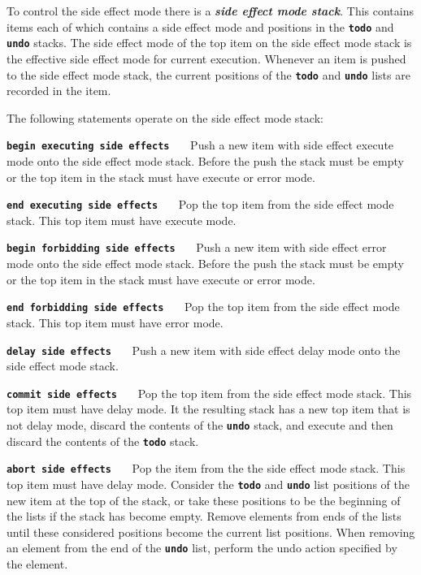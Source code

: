 \documentclass[12pt]{article}
\makeatletter
\newcommand{\TT}[1]{{\tt \bfseries #1}}
\newcommand{\key}[1]{{\bf \em #1}\index{#1}}
\newcommand{\ttlkey}[2]{\TT{#1 #2}\index{#1@{\tt #1}!#2@{\tt #2}}}
\makeatother
\begin{document}
To control the side effect mode there is a \key{side effect mode stack}.
This contains items each of which contains a side effect mode and
positions in the \TT{todo} and \TT{undo} stacks.  The side effect mode
of the top item on the side effect mode stack is the effective side
effect mode for current execution.
Whenever an item is pushed to the side effect mode stack, the current
positions of the \TT{todo} and \TT{undo} lists are recorded in the
item.

The following statements operate on the side effect mode stack:

\begin{list}{}{}
\item[\ttlkey{begin executing}{side effects}]~~~Push a new item with side effect
execute mode onto the side effect mode stack.  Before the push the
stack must be empty or the top item in the stack must have execute or
error mode.

\item[\ttlkey{end executing}{side effects}]~~~Pop the top item from
the side effect mode stack.  This top item must have
execute mode.

\item[\ttlkey{begin forbidding}{side effects}]~~~Push
a new item with side effect
error mode onto the side effect mode stack.  Before the push the
stack must be empty or the top item in the stack must have execute or
error mode.

\item[\ttlkey{end forbidding}{side effects}]~~~Pop the top item from the
side effect mode stack.  This top item must have
error mode.

\item[\ttlkey{delay}{side effects}]~~~Push a new item with side effect
delay mode onto the side effect mode stack.

\item[\ttlkey{commit}{side effects}]~~~Pop the top item from the
side effect mode stack.  This top item must have
delay mode.  It the resulting stack has a new top item that is not
delay mode, discard the contents of the \TT{undo} stack, and execute
and then discard the contents of the \TT{todo} stack.

\item[\ttlkey{abort side}{effects}]~~~Pop the item from the
the side effect mode stack.  This top item must have
delay mode.  Consider the \TT{todo} and \TT{undo} list positions
of the new item at the top of the stack, or take these positions to be
the beginning of the lists if the stack has become empty.  Remove
elements from ends of the lists until these considered positions become
the current list positions.  When removing an element from the end of the
\TT{undo} list, perform the undo action specified by the element.

\end{list}
\end{document}

